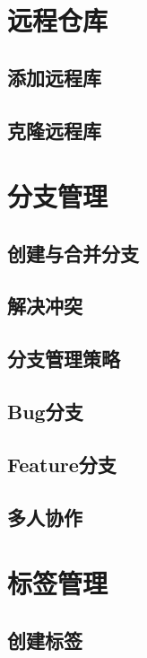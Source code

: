 \section{远程仓库}

\subsection{添加远程库}

\subsection{克隆远程库}

\section{分支管理}

\subsection{创建与合并分支}

\subsection{解决冲突}

\subsection{分支管理策略}

\subsection{Bug分支}

\subsection{Feature分支}

\subsection{多人协作}

\section{标签管理}

\subsection{创建标签}

